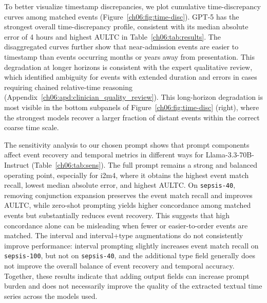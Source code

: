 To better visualize timestamp discrepancies, we plot cumulative time-discrepancy curves among matched events (Figure~\ref{ch06:fig:time-disc}).
GPT-5 has the strongest overall time-discrepancy profile, consistent with its median absolute error of 4 hours and highest AULTC in Table~\ref{ch06:tab:results}.
The disaggregated curves further show that near-admission events are easier to timestamp than events occurring months or years away from presentation.
This degradation at longer horizons is consistent with the expert qualitative review, which identified ambiguity for events with extended duration and errors in cases requiring chained relative-time reasoning (Appendix~\ref{ch06:apd:clinician_quality_review}).
This long-horizon degradation is most visible in the bottom subpanels of Figure~\ref{ch06:fig:time-disc} (right), where the strongest models recover a larger fraction of distant events within the correct coarse time scale.

The sensitivity analysis to our chosen prompt shows that prompt components affect event recovery and temporal metrics in different ways for Llama-3.3-70B-Instruct (Table~\ref{ch06:tab:sens}).
The full prompt remains a strong and balanced operating point, especially for i2m4, where it obtains the highest event match recall, lowest median absolute error, and highest AULTC.
On \texttt{sepsis-40}, removing conjunction expansion preserves the event match recall and improves AULTC, while zero-shot prompting yields higher concordance among matched events but substantially reduces event recovery.
This suggests that high concordance alone can be misleading when fewer or easier-to-order events are matched.
The interval and interval+type augmentations do not consistently improve performance: interval prompting slightly increases event match recall on \texttt{sepsis-100}, but not on \texttt{sepsis-40}, and the additional type field generally does not improve the overall balance of event recovery and temporal accuracy.
Together, these results indicate that adding output fields can increase prompt burden and does not necessarily improve the quality of the extracted textual time series across the models used.





